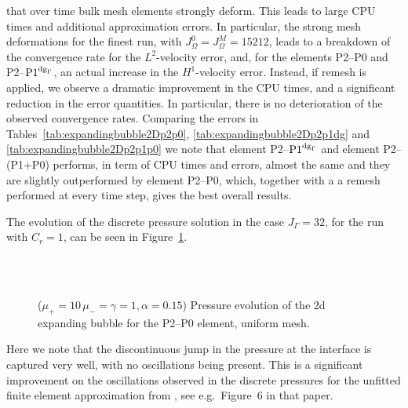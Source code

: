 that over time bulk mesh elements strongly deform. This leads to large CPU
times and additional approximation errors. In particular, the strong mesh
deformations for the finest run, with $J_\Omega^0 = J_\Omega^M = 15212$, leads
to a breakdown of the convergence rate for the $L^2$-velocity error, and, for
the elements P2--P0 and P2--${\rm P1}^{{\rm dg}_\Gamma}$, an actual increase in the $H^1$-velocity
error. Instead, if remesh is applied, we observe a dramatic improvement in the
CPU times, and a significant reduction in the error quantities. In particular,
there is no deterioration of the observed convergence rates. Comparing the
errors in Tables~\ref{tab:expandingbubble2Dp2p0},
\ref{tab:expandingbubble2Dp2p1dg} and \ref{tab:expandingbubble2Dp2p1p0} we note
that element P2--${\rm P1}^{{\rm dg}_\Gamma}$ and element P2--(P1+P0) performs, in term of CPU times
and errors, almost the same and they are slightly outperformed by element
P2--P0, which, together with a a remesh performed at every time step, gives the
best overall results.

The evolution of the discrete pressure solution in the case $J_\Gamma = 32$,
for the run with $C_r = 1$, can be seen in
Figure~\ref{fig:expanding_bubble_uniform}.
\begin{figure}[htbp]
\centering
{}\\
\\
\caption[Stokes expanding bubble pressure uniform mesh]
{($\mu_+ = 10\,\mu_- = \gamma = 1,\alpha = 0.15$) Pressure evolution of
the 2d expanding bubble for the P2--P0 element, uniform mesh.}
\label{fig:expanding_bubble_uniform}
\end{figure}
Here we note that the discontinuous jump in the pressure at the interface is
captured very well, with no oscillations being present. This is a significant
improvement on the oscillations observed in the discrete pressures for the
unfitted finite element approximation from \cite{spurious}, see e.g.\
Figure~6 in that paper.

